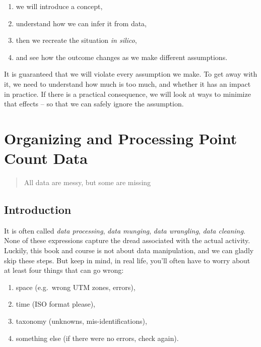 \documentclass[12pt,]{book}
\providecommand{\tightlist}{%
  \setlength{\itemsep}{0pt}\setlength{\parskip}{0pt}}
\begin{document}
\begin{enumerate}
\def\labelenumi{\arabic{enumi}.}
\tightlist
\item
  we will introduce a concept,
\item
  understand how we can infer it from data,
\item
  then we recreate the situation \emph{in silico},
\item
  and see how the outcome changes as we make different assumptions.
\end{enumerate}

It is guaranteed that we will violate every assumption we make.
To get away with it, we need to understand how much is too much,
and whether it has an impact in practice.
If there is a practical consequence, we will look at ways to minimize
that effects -- so that we can safely ignore the assumption.

\hypertarget{pcdata}{%
\chapter{Organizing and Processing Point Count Data}\label{pcdata}}

\begin{quote}
All data are messy, but some are missing
\end{quote}

\hypertarget{introduction}{%
\section{Introduction}\label{introduction}}

It is often called \emph{data processing}, \emph{data munging},
\emph{data wrangling}, \emph{data cleaning}.
None of these expressions capture the dread associated with the actual activity.
Luckily, this book and course is not about data manipulation,
and we can gladly skip these steps. But keep in mind,
in real life, you'll often have to worry about at least four things
that can go wrong:

\begin{enumerate}
\def\labelenumi{\arabic{enumi}.}
\tightlist
\item
  space (e.g.~wrong UTM zones, errors),
\item
  time (ISO format please),
\item
  taxonomy (unknowns, mis-identifications),
\item
  something else (if there were no errors, check again).
\end{enumerate}
\end{document}
